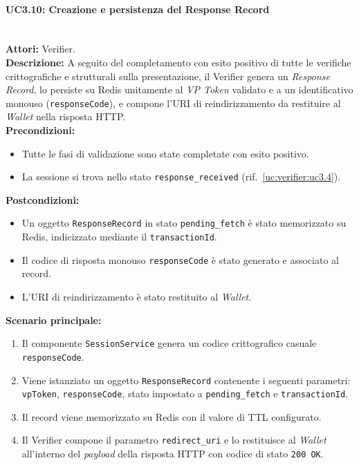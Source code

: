 \paragraph{\large\bfseries UC3.10: Creazione e persistenza del Response Record}
\label{uc:verifier:uc3.10}
\mbox{}\\
\noindent\textbf{Attori:} Verifier.
\\
\noindent\textbf{Descrizione:} A seguito del completamento con esito positivo di tutte le verifiche crittografiche e strutturali sulla presentazione, il Verifier genera un \textit{Response Record}, lo persiste su Redis unitamente al \textit{VP Token} validato e a un identificativo monouso (\texttt{responseCode}), e compone l'URI di reindirizzamento da restituire al \textit{Wallet} nella risposta HTTP.
\\
\noindent\textbf{Precondizioni:}
\begin{itemize}
    \item Tutte le fasi di validazione sono state completate con esito positivo.
    \item La sessione si trova nello stato \texttt{response\_\allowbreak{}received} (rif.\ \ref{uc:verifier:uc3.4}).
\end{itemize}
\noindent\textbf{Postcondizioni:}
\begin{itemize}
    \item Un oggetto \texttt{ResponseRecord} in stato \texttt{pending\_\allowbreak{}fetch} è stato memorizzato su Redis, indicizzato mediante il \texttt{transactionId}.
    \item Il codice di risposta monouso \texttt{responseCode} è stato generato e associato al record.
    \item L'URI di reindirizzamento è stato restituito al \textit{Wallet}.
\end{itemize}

\noindent\textbf{Scenario principale:}
\begin{enumerate}
    \item Il componente \texttt{SessionService} genera un codice crittografico casuale \texttt{responseCode}.
    \item Viene istanziato un oggetto \texttt{ResponseRecord} contenente i seguenti parametri: \texttt{vpToken}, \texttt{responseCode}, stato impostato a \texttt{pending\_\allowbreak{}fetch} e \texttt{transactionId}.
    \item Il record viene memorizzato su Redis con il valore di TTL configurato.
    \item Il Verifier compone il parametro \texttt{redirect\_\allowbreak{}uri} e lo restituisce al \textit{Wallet} all'interno del \textit{payload} della risposta HTTP con codice di stato \texttt{200 OK}.
\end{enumerate}

